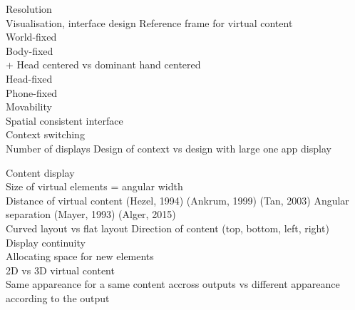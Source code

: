        Resolution \\

    Visualisation, interface design
        Reference frame for virtual content \\
            World-fixed \cite{EnsFinneganIrani2014} \\
            Body-fixed \cite{EnsFinneganIrani2014} \\
                + Head centered vs dominant hand centered \\
            Head-fixed \cite{EnsFinneganIrani2014} \\
            Phone-fixed \\
        	Movability \cite{EnsHincapie-RamosIrani2014} \\
            Spatial consistent interface \cite{LiDearmanTruong2009} \\

        Context switching \\
            Number of displays \cite{RashidNacentaQuigley2012} \cite{CauchardLoechtefeldFraserEtAl2012}
            Design of context vs design with large one app display \cite{BallNorth2008}

        Content display \\
            Size of virtual elements = angular width \cite{ShuppBallYostEtAl2006} \cite{BallNorth2008} \\
            Distance of virtual content (Hezel, 1994) (Ankrum, 1999) (Tan, 2003) \cite{ChanKaoChenEtAl2010} \cite{EnsFinneganIrani2014} 
            Angular separation (Mayer, 1993) \cite{EnsFinneganIrani2014} \cite{KishishitaKiyokawaOrloskyEtAl2014} (Alger, 2015) \\ 
            Curved layout vs flat layout \cite{ShuppBallYostEtAl2006} 
            Direction of content (top, bottom, left, right) \cite{EnsFinneganIrani2014} \\
            Display continuity \cite{TanCzerwinski2003} \cite{RashidNacentaQuigley2012} \\
            Allocating space for new elements \cite{BellFeiner2000} \\

            2D vs 3D virtual content \cite{JansenDragicevicFekete2013} \cite{SerranoHildebrandtSubramanianEtAl2014} \\
            Same appareance for a same content accross outputs vs different appareance according to the output \cite{GrubertHeinischQuigleyEtAl2015} \\

